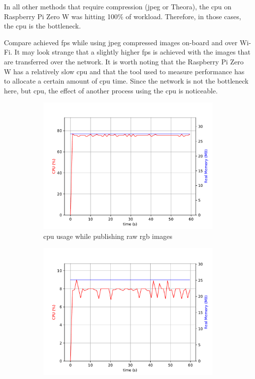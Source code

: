 In all other methods that require compression (\ac{jpeg} or Theora), the \ac{cpu} on Raspberry Pi Zero W was hitting 100\% of workload.
Therefore, in those cases, the \ac{cpu} is the bottleneck.

Compare achieved \ac{fps} while using \ac{jpeg} compressed images on-board and over Wi-Fi. 
It may look strange that a slightly higher \ac{fps} is achieved with the images that are transferred over the network. 
It is worth noting that the Raspberry Pi Zero W has a relatively slow \ac{cpu} and that the tool used to measure performance has to allocate a certain amount of \ac{cpu} time.
Since the network is not the bottleneck here, but \ac{cpu}, the effect of another process using the \ac{cpu} is noticeable.

\begin{figure}[H]
\centering
\begin{subfigure}{.8\textwidth}
  \centering
  \includegraphics[width=\linewidth]{results/figures/camera_raw_cpu}
  \caption{\ac{cpu} usage while publishing raw \ac{rgb} images}
  \label{fig:results:camera_load:raw_cpu}
\end{subfigure}
\begin{subfigure}{.8\textwidth}
  \centering
  \includegraphics[width=\linewidth]{results/figures/camera_jpeg_gpu.pdf}

\end{subfigure}
\end{figure}
